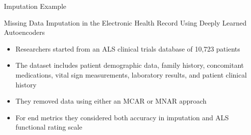 \documentclass[10pt, xcolor=table]{beamer}
\begin{document}

\begin{frame}{Imputation Example}
	\begin{center}
		Missing Data Imputation in the Electronic Health Record Using Deeply Learned Autoencoders
	\end{center}
	\begin{itemize}
		\item Researchers started from an ALS clinical trials database of 10,723 patients
		\item The dataset includes  patient demographic data, family history, concomitant medications, vital sign measurements, laboratory results, and patient clinical history
		\item They removed data using either an MCAR or MNAR approach
		\item For end metrics they considered both accuracy in imputation and ALS functional rating scale
	\end{itemize}
\end{frame}
\end{document}
